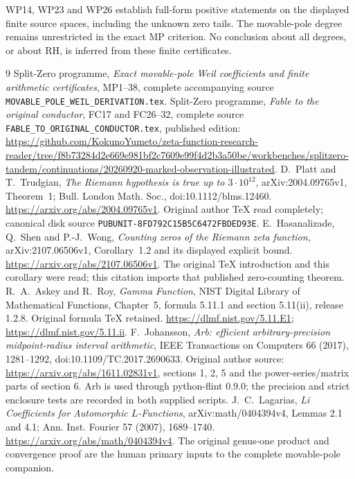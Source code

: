 \documentclass[11pt]{article}
\begin{document}
WP14, WP23 and WP26 establish full-form positive statements on
the displayed finite source spaces, including the unknown
zero tails. The movable-pole degree remains unrestricted in
the exact MP criterion. No conclusion about all degrees, or
about RH, is inferred from these finite certificates.

\begin{thebibliography}{9}
 Split-Zero programme,
\emph{Exact movable-pole Weil coefficients and finite arithmetic
certificates}, MP1--38, complete accompanying source
\texttt{MOVABLE\_POLE\_WEIL\_DERIVATION.tex}.
 Split-Zero programme,
\emph{Fable to the original conductor}, FC17 and FC26--32,
complete source \texttt{FABLE\_TO\_ORIGINAL\_CONDUCTOR.tex},
published edition:
\url{https://github.com/KokunoYumeto/zeta-function-research-reader/tree/f8b73284d2e669e981bf2c7609e99f4d2b3a50be/workbenches/splitzero-tandem/continuations/20260920-marked-observation-illustrated}.
 D.~Platt and T.~Trudgian,
\emph{The Riemann hypothesis is true up to $3\cdot10^{12}$},
arXiv:2004.09765v1, Theorem~1; Bull. London Math. Soc.,
doi:10.1112/blms.12460.
\url{https://arxiv.org/abs/2004.09765v1}.
Original author TeX read completely; canonical disk source
\texttt{PUBUNIT-8FD792C15B5C6472FBDED93E}.
 E.~Hasanalizade, Q.~Shen and P.-J.~Wong,
\emph{Counting zeros of the Riemann zeta function},
arXiv:2107.06506v1, Corollary~1.2 and its displayed explicit
bound. \url{https://arxiv.org/abs/2107.06506v1}.
The original TeX introduction and this corollary were read;
this citation imports that published zero-counting theorem.
 R.~A.~Askey and R.~Roy,
\emph{Gamma Function}, NIST Digital Library of Mathematical
Functions, Chapter~5, formula 5.11.1 and section 5.11(ii),
release 1.2.8. Original formula TeX retained.
\url{https://dlmf.nist.gov/5.11.E1};
\url{https://dlmf.nist.gov/5.11.ii}.
 F.~Johansson,
\emph{Arb: efficient arbitrary-precision midpoint-radius
interval arithmetic}, IEEE Transactions on Computers 66
(2017), 1281--1292, doi:10.1109/TC.2017.2690633.
Original author source: \url{https://arxiv.org/abs/1611.02831v1},
sections 1, 2, 5 and the power-series/matrix parts of section 6.
Arb is used through python-flint 0.9.0; the precision and
strict enclosure tests are recorded in both supplied scripts.
 J.~C.~Lagarias,
\emph{Li Coefficients for Automorphic $L$-Functions},
arXiv:math/0404394v4, Lemmas 2.1 and 4.1; Ann. Inst. Fourier
57 (2007), 1689--1740.
\url{https://arxiv.org/abs/math/0404394v4}.
The original genus-one product and convergence proof are the
human primary inputs to the complete movable-pole companion.
\end{thebibliography}
\end{document}
